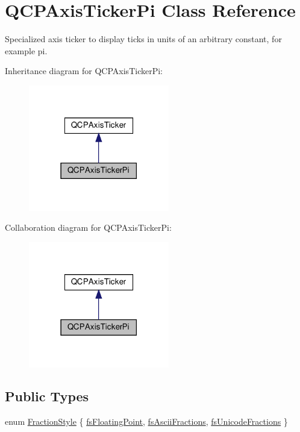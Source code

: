 \hypertarget{classQCPAxisTickerPi}{}\section{Q\+C\+P\+Axis\+Ticker\+Pi Class Reference}
\label{classQCPAxisTickerPi}


Specialized axis ticker to display ticks in units of an arbitrary constant, for example pi.  




Inheritance diagram for Q\+C\+P\+Axis\+Ticker\+Pi\+:\nopagebreak
\begin{figure}[H]
\begin{center}
\leavevmode
\includegraphics[width=174pt]{classQCPAxisTickerPi__inherit__graph}
\end{center}
\end{figure}


Collaboration diagram for Q\+C\+P\+Axis\+Ticker\+Pi\+:\nopagebreak
\begin{figure}[H]
\begin{center}
\leavevmode
\includegraphics[width=174pt]{classQCPAxisTickerPi__coll__graph}
\end{center}
\end{figure}
\subsection*{Public Types}
\begin{DoxyCompactItemize}
\item 
enum \hyperlink{classQCPAxisTickerPi_a262f1534c7f0c79a7d5237f5d1e2c54c}{Fraction\+Style} \{ \hyperlink{classQCPAxisTickerPi_a262f1534c7f0c79a7d5237f5d1e2c54ca00f097b669b2a0e22f508f1ae97877d8}{fs\+Floating\+Point}, 
\hyperlink{classQCPAxisTickerPi_a262f1534c7f0c79a7d5237f5d1e2c54ca05a5457e0e14cb726f623e25282066b3}{fs\+Ascii\+Fractions}, 
\hyperlink{classQCPAxisTickerPi_a262f1534c7f0c79a7d5237f5d1e2c54ca92f38a938c8b179b23363d9993681c55}{fs\+Unicode\+Fractions}
 \}
\end{DoxyCompactItemize}
